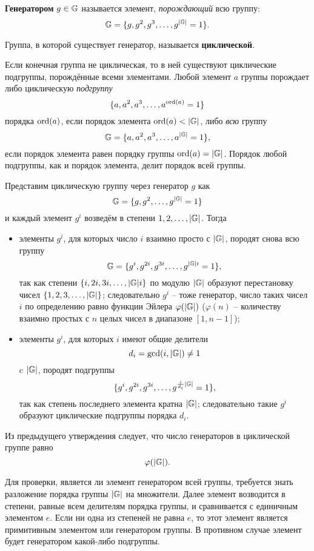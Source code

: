 \textbf{Генератором} $g \in \mathbb{G}$ называется элемент, \emph{порождающий} всю группу:
    \[ \mathbb{G} = \{g, g^2, g^3, \ldots, g^{|\mathbb{G}|} = 1\}. \]

Группа, в которой существует генератор, называется \textbf{циклической}.

Если конечная группа не циклическая, то в ней существуют циклические подгруппы, порождённые всеми элементами. Любой элемент $a$ группы порождает либо циклическую \emph{подгруппу}
    \[ \{ a, a^2, a^3, \dots, a^{\operatorname{ord}(a)} = 1 \} \]
порядка $\operatorname{ord}(a)$, если порядок элемента $\operatorname{ord}(a) < |\mathbb{G}|$, либо \emph{всю} группу
    \[ \mathbb{G} = \{ a, a^2, a^3, \dots, a^{|\mathbb{G}|} = 1 \}, \]
если порядок элемента равен порядку группы $\operatorname{ord}(a) = |\mathbb{G}|$. Порядок любой подгруппы, как и порядок элемента, делит порядок всей группы.

Представим циклическую группу через генератор $g$ как
    \[ \mathbb{G} = \{g, g^2, \ldots, g^{|\mathbb{G}|} = 1\} \]
и каждый элемент $g^i$ возведём в степени $1, 2, \ldots, |\mathbb{G}|$. Тогда
\begin{itemize}
    \item элементы $g^i$, для которых число $i$ взаимно просто с $|\mathbb{G}|$, породят снова всю группу
            \[ \mathbb{G} = \{ g^i, g^{2i}, g^{3i}, \dots, g^{|\mathbb{G}| i} = 1 \}, \]
        так как степени $\{i, 2i, 3i, \dots, |\mathbb{G}| i \}$ по модулю $|\mathbb{G}|$ образуют перестановку чисел $\{1, 2, 3, \dots, |\mathbb{G}|\}$; следовательно $g^i$ -- тоже генератор, число таких чисел $i$ по определению равно функции Эйлера $\varphi(|\mathbb{G}|)$ ($\varphi(n)$ -- количеству взаимно простых с $n$ целых чисел в диапазоне $[1,n-1]$);
    \item элементы $g^i$, для которых $i$ имеют общие делители
            \[ d_i = \gcd(i, |\mathbb{G}|) \neq 1 \]
        c $|\mathbb{G}|$, породят подгруппы
            \[ \{ g^i, g^{2i}, g^{3i}, \dots, g^{\frac{i}{d_i} |\mathbb{G}|} = 1\}, \]
        так как степень последнего элемента кратна $|\mathbb{G}|$; следовательно такие $g^i$ образуют циклические подгруппы порядка $d_i$.
\end{itemize}

Из предыдущего утверждения следует, что число генераторов в циклической группе равно
    \[ \varphi(|\mathbb{G}|). \]

Для проверки, является ли элемент генератором всей группы, требуется знать разложение порядка группы $|\mathbb{G}|$ на множители. Далее элемент возводится в степени, равные всем делителям порядка группы, и сравнивается с единичным элементом $e$. Если ни одна из степеней не равна $e$, то этот элемент является примитивным элементом или генератором группы. В противном случае элемент будет генератором какой-либо подгруппы.

